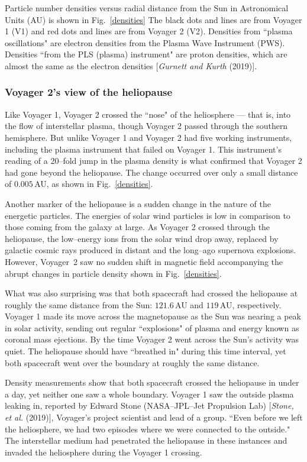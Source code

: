 \documentclass[a4paper,openany,12pt]{book}
\begin{document}
Particle number densities versus radial distance from the Sun in Astronomical Units (AU) is shown in Fig.~\ref{densities} The black dots and lines are from Voyager 1 (V1) and red dots and lines are from Voyager 2 (V2). Densities from ``plasma oscillations" are electron densities from the Plasma Wave Instrument (PWS). Densities ``from the PLS (plasma) instrument" are proton densities, which are almost the same as the electron densities [\emph{Gurnett and Kurth} (2019)].

\subsubsection{Voyager 2's view of the heliopause}

Like Voyager 1, Voyager 2 crossed the ``nose" of the heliosphere --- that is, into the flow of interstellar plasma, though Voyager 2 passed through the southern hemisphere. But unlike Voyager 1 and Voyager 2 had five working instruments, including the plasma instrument that failed on Voyager 1. This instrument's reading of a 20--fold jump in the plasma density is what confirmed that Voyager 2 had gone beyond the heliopause. The change occurred over only a small distance of $0.005\,$AU, as shown in Fig.~\ref{densities}.

Another marker of the heliopause is a sudden change in the nature of the energetic particles. The energies of solar wind particles is low in comparison to those coming from the galaxy at large. As Voyager 2 crossed through the heliopause, the low--energy ions from the solar wind drop away, replaced by galactic cosmic rays produced in distant and the long--ago supernova explosions. However, Voyager~2 saw no sudden shift in magnetic field accompanying the abrupt changes in particle density shown in Fig.~\ref{densities}.

What was also surprising was that both spacecraft had crossed the heliopause at roughly the same distance from the Sun: $121.6\,$AU and $119\,$AU, respectively. Voyager 1 made its move across the magnetopause as the Sun was nearing a peak in solar activity, sending out regular ``explosions" of plasma and energy known as coronal mass ejections. By the time Voyager 2 went across the Sun's activity was quiet. The heliopause should have ``breathed in" during this time interval, yet both spacecraft went over the boundary at roughly the same distance. 

Density measurements show that both spacecraft crossed the heliopause in under a day, yet neither one saw a whole boundary. Voyager 1 saw the outside plasma leaking in, reported by Edward Stone (NASA--JPL--Jet Propulsion Lab) [\emph{Stone, et al.} (2019)], Voyager's project scientist and lead of a group. ``Even before we left the heliosphere, we had two episodes where we were connected to the outside." The interstellar medium had penetrated the heliopause in these instances and invaded the heliosphere during the Voyager 1 crossing.
\end{document}
